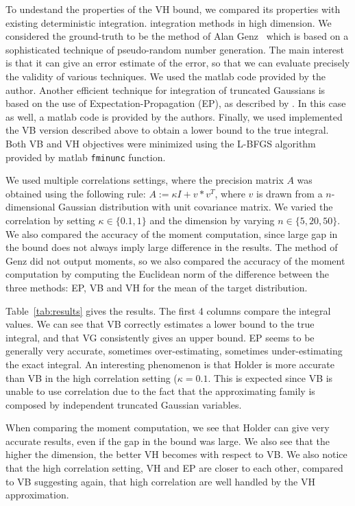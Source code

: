 \documentclass[reqno,oneside,letterpaper,10pt]{article}
\begin{document}
To undestand the properties of the VH bound, we compared its properties with existing deterministic integration. integration methods in high dimension. We considered the ground-truth to be the method of Alan Genz~\citep{genz2009computation}
which is based on a sophisticated technique of pseudo-random number generation. The main interest is that it can give an error estimate of the error, so that we can evaluate precisely the validity of various techniques. We used the matlab code provided by the author.
Another efficient technique for integration of truncated Gaussians is based on the use of Expectation-Propagation (EP), as
described by \citet{Cunningham-et-al-Gaussian-EP2012}. In this case as well, a matlab code is provided by the authors. 
Finally, we used implemented the VB version described above to obtain a lower bound to the true integral. 
Both VB and VH objectives were minimized using the L-BFGS algorithm provided by matlab \texttt{fminunc} function.

We used multiple correlations settings, where the precision matrix $A$ was obtained using the following rule:
$A:=\kappa I + v*v^T $, where $v$ is drawn from a $n$-dimensional Gaussian distribution with unit covariance matrix.
We varied the correlation by setting $\kappa\in\{0.1,1\}$ and the dimension by varying $n\in\{5, 20, 50\}$.
We also compared the accuracy of the moment computation, since large gap in the bound does not always imply large difference in the results. The method of Genz did not output moments, so we also compared the accuracy of the moment computation by computing the Euclidean norm of the difference between the three methods: EP, VB and VH for the mean
of the target distribution. %

 Table~\ref{tab:results} gives the results. The first 4 columns compare the integral values. We can see that VB correctly estimates a lower bound to the true integral, and that VG consistently gives an upper bound. EP seems to be generally very accurate, sometimes over-estimating, sometimes under-estimating the exact integral. An interesting phenomenon is that Holder is more accurate than VB in the high correlation setting ($\kappa=0.1$. This is expected since VB is unable to use correlation due to the fact that the 
 approximating family is composed by independent truncated Gaussian variables.

When comparing the moment computation, we see that Holder can give very accurate results, even if the gap in the bound was large. We also see that the higher the dimension, the better VH becomes with respect to VB. We also notice that the high correlation setting, VH and EP are closer to each other, compared to VB suggesting again, that high correlation are well handled by the VH approximation. 
\end{document}
